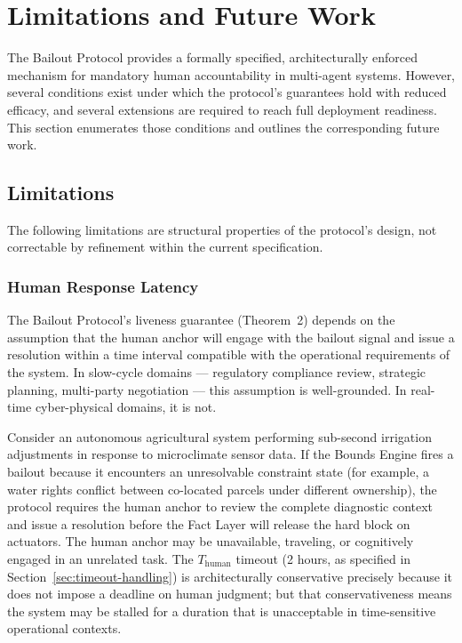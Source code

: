 \section{Limitations and Future Work}\label{sec:limitations}

The Bailout Protocol provides a formally specified, architecturally enforced mechanism for mandatory human accountability in multi-agent systems. However, several conditions exist under which the protocol's guarantees hold with reduced efficacy, and several extensions are required to reach full deployment readiness. This section enumerates those conditions and outlines the corresponding future work.

\subsection{Limitations}\label{sec:limitations:subsection}

The following limitations are structural properties of the protocol's design, not correctable by refinement within the current specification.

\subsubsection{Human Response Latency}\label{sec:human-response-latency}

The Bailout Protocol's liveness guarantee (Theorem~2) depends on the assumption that the human anchor will engage with the bailout signal and issue a resolution within a time interval compatible with the operational requirements of the system. In slow-cycle domains --- regulatory compliance review, strategic planning, multi-party negotiation --- this assumption is well-grounded. In real-time cyber-physical domains, it is not.

Consider an autonomous agricultural system performing sub-second irrigation adjustments in response to microclimate sensor data. If the Bounds Engine fires a bailout because it encounters an unresolvable constraint state (for example, a water rights conflict between co-located parcels under different ownership), the protocol requires the human anchor to review the complete diagnostic context and issue a resolution before the Fact Layer will release the hard block on actuators. The human anchor may be unavailable, traveling, or cognitively engaged in an unrelated task. The $T_{\text{human}}$ timeout (2 hours, as specified in Section~\ref{sec:timeout-handling}) is architecturally conservative precisely because it does not impose a deadline on human judgment; but that conservativeness means the system may be stalled for a duration that is unacceptable in time-sensitive operational contexts.

